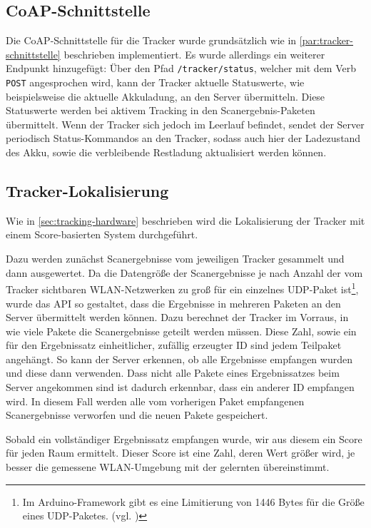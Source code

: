 \subsection{CoAP-Schnittstelle}

Die \gls{CoAP}-Schnittstelle für die Tracker wurde grundsätzlich wie in
\autoref{par:tracker-schnittstelle} beschrieben implementiert. Es wurde allerdings ein weiterer
Endpunkt hinzugefügt: Über den Pfad \texttt{/tracker/status}, welcher mit dem Verb \texttt{POST}
angesprochen wird, kann der Tracker aktuelle Statuswerte, wie beispielsweise die aktuelle
Akkuladung, an den Server übermitteln. Diese Statuswerte werden bei aktivem Tracking in den
Scanergebnis-Paketen übermittelt. Wenn der Tracker sich jedoch im Leerlauf befindet, sendet der
Server periodisch Status-Kommandos an den Tracker, sodass auch hier der Ladezustand des \gls{Akku}, sowie
die verbleibende Restladung aktualisiert werden können.

\subsection{Tracker-Lokalisierung}

Wie in \autoref{sec:tracking-hardware} beschrieben wird die Lokalisierung der Tracker mit einem
Score-basierten System durchgeführt.

Dazu werden zunächst Scanergebnisse vom jeweiligen Tracker gesammelt und dann ausgewertet. Da die
Datengröße der Scanergebnisse je nach Anzahl der vom Tracker sichtbaren \gls{WLAN}-Netzwerken zu
groß für ein einzelnes \gls{UDP}-Paket ist\footnote{Im Arduino-Framework gibt es eine
Limitierung von 1446 Bytes für die Größe eines \gls{UDP}-Paketes. (vgl. \cite{Arduino2020})}, wurde
das \gls{API} so gestaltet, dass die Ergebnisse in mehreren Paketen an den Server übermittelt werden
können. Dazu berechnet der Tracker im Vorraus, in wie viele Pakete die Scanergebnisse geteilt werden
müssen. Diese Zahl, sowie ein für den Ergebnissatz einheitlicher, zufällig erzeugter \gls{ID} sind
jedem Teilpaket angehängt. So kann der Server erkennen, ob alle Ergebnisse empfangen wurden und
diese dann verwenden. Dass nicht alle Pakete eines Ergebnissatzes beim Server angekommen sind ist
dadurch erkennbar, dass ein anderer \gls{ID} empfangen wird. In diesem Fall werden alle vom
vorherigen Paket empfangenen Scanergebnisse verworfen und die neuen Pakete gespeichert.

Sobald ein vollständiger Ergebnissatz empfangen wurde, wir aus diesem ein Score für jeden Raum
ermittelt. Dieser Score ist eine Zahl, deren Wert größer wird, je besser die gemessene
\gls{WLAN}-Umgebung mit der gelernten übereinstimmt.

